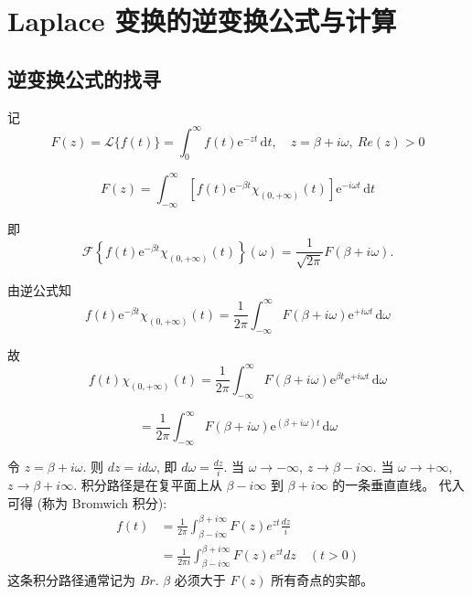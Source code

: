\documentclass[linespread=1.5,openany]{book}%
\def\diff{d}%
\theoremstyle{plain}
\newcommand{\diff}{\mathop{}\!\mathrm{d}}  %
\begin{document}
{{{{						{\chapter{Laplace 变换的逆变换公式与计算}
							{ %
								
								\section{逆变换公式的找寻 }
								{ %
									记
									\[
									F(z) = \mathcal{L}\{f(t)\} = \int_{0}^{\infty} f(t) \mathrm{e}^{-zt} \,\mathrm{d}t, \quad z = \beta + i\omega, \ Re(z) > 0
									\]
									
									\begin{equation}
										F(z) = \int_{-\infty}^{\infty} \left[ f(t) \mathrm{e}^{-\beta t} \chi_{(0,+\infty)}(t) \right] \mathrm{e}^{-i\omega t} \,\mathrm{d}t
									\end{equation}
									
									即
									\begin{equation}
										\mathcal{F}\left\{ f(t) \mathrm{e}^{-\beta t} \chi_{(0,+\infty)}(t) \right\} (\omega) = \frac{1}{\sqrt{2\pi}} F(\beta + i\omega).
									\end{equation}
									
									由逆公式知
									\[
									f(t) \mathrm{e}^{-\beta t} \chi_{(0,+\infty)}(t) = \frac{1}{2\pi} \int_{-\infty}^{\infty} F(\beta + i\omega) \mathrm{e}^{+i\omega t} \,\mathrm{d}\omega
									\]
									
									故
									\[
									f(t) \chi_{(0,+\infty)}(t) = \frac{1}{2\pi} \int_{-\infty}^{\infty} F(\beta + i\omega) \mathrm{e}^{\beta t} \mathrm{e}^{+i\omega t} \,\mathrm{d}\omega
									\]
									
									\begin{equation}
										= \frac{1}{2\pi} \int_{-\infty}^{\infty} F(\beta + i\omega) \mathrm{e}^{(\beta + i\omega) t} \,\mathrm{d}\omega
									\end{equation}
									
									
									
									
									
									令 $z = \beta+i\omega$. 则 $\diff z = i \diff \omega$, 即 $\diff \omega = \frac{\diff z}{i}$.
									当 $\omega \to -\infty$, $z \to \beta-i\infty$.
									当 $\omega \to +\infty$, $z \to \beta+i\infty$.
									积分路径是在复平面上从 $\beta-i\infty$ 到 $\beta+i\infty$ 的一条垂直直线。
									代入可得 (称为 Bromwich 积分):
									\begin{equation}
										\begin{aligned}
											f(t) &= \frac{1}{2\pi} \int_{\beta-i\infty}^{\beta+i\infty} F(z) e^{zt} \frac{\diff z}{i} \\
											&= \frac{1}{2\pi i} \int_{\beta-i\infty}^{\beta+i\infty} F(z) e^{zt} \diff z \quad (t>0)
										\end{aligned}
									\end{equation}
									这条积分路径通常记为 $Br$. $\beta$ 必须大于 $F(z)$ 所有奇点的实部。
									
}}}}}}}
\end{document}
